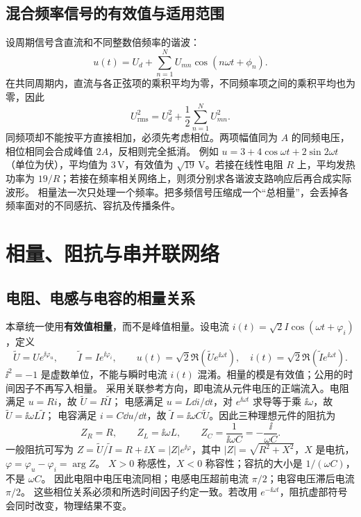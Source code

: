 \subsection{混合频率信号的有效值与适用范围}
设周期信号含直流和不同整数倍频率的谐波：
\[
 u(t)=U_d+\sum_{n=1}^{N}U_{mn}\cos(n\omega t+\phi_n).
\]
在共同周期内，直流与各正弦项的乘积平均为零，不同频率项之间的乘积平均也为零，因此
\[
 U_{\mathrm{rms}}^2=U_d^2+\frac12\sum_{n=1}^{N}U_{mn}^2.
\]
同频项却不能按平方直接相加，必须先考虑相位。两项幅值同为 $A$ 的同频电压，相位相同会合成峰值 $2A$，反相则完全抵消。
例如 $u=3+4\cos\omega t+2\sin2\omega t$（单位为伏），平均值为 $3\,\mathrm V$，有效值为 $\sqrt{19}\,\mathrm V$。若接在线性电阻 $R$ 上，平均发热功率为 $19/R$；若接在频率相关网络上，则须分别求各谐波支路响应后再合成实际波形。
相量法一次只处理一个频率。把多频信号压缩成一个“总相量”，会丢掉各频率面对的不同感抗、容抗及传播条件。



\section{相量、阻抗与串并联网络}

\subsection{电阻、电感与电容的相量关系}


本章统一使用\textbf{有效值相量}，而不是峰值相量。设电流
$i(t)=\sqrt2 I\cos(\omega t+\varphi_i)$，定义
\begin{equation}
 \widetilde U=Ue^{\ii\varphi_u},\qquad
 \widetilde I=Ie^{\ii\varphi_i},\qquad
 u(t)=\sqrt2\Re(\widetilde Ue^{\ii\omega t}),\quad
 i(t)=\sqrt2\Re(\widetilde Ie^{\ii\omega t}).
\end{equation}
$\ii^2=-1$ 是虚数单位，不能与瞬时电流 $i(t)$ 混淆。相量的模是有效值；公用的时间因子不再写入相量。
采用关联参考方向，即电流从元件电压的正端流入。电阻满足 $u=Ri$，故 $\widetilde U=R\widetilde I$；
电感满足 $u=L\dd i/\dd t$，对 $e^{\ii\omega t}$ 求导等于乘 $\ii\omega$，故 $\widetilde U=\ii\omega L\widetilde I$；
电容满足 $i=C\dd u/\dd t$，故 $\widetilde I=\ii\omega C\widetilde U$。因此三种理想元件的阻抗为
\begin{equation}
 Z_R=R,\qquad Z_L=\ii\omega L,\qquad Z_C=\frac1{\ii\omega C}=-\frac{\ii}{\omega C}.
\end{equation}
一般阻抗可写为 $Z=\widetilde U/\widetilde I=R+\ii X=|Z|e^{\ii\varphi}$，其中
$|Z|=\sqrt{R^2+X^2}$，$X$ 是电抗，$\varphi=\varphi_u-\varphi_i=\arg Z$。
$X>0$ 称感性，$X<0$ 称容性；容抗的大小是 $1/(\omega C)$，不是 $\omega C$。
因此电阻中电压电流同相；电感电压超前电流 $\pi/2$；电容电压滞后电流 $\pi/2$。
这些相位关系必须和所选时间因子约定一致。若改用 $e^{-\ii\omega t}$，阻抗虚部符号会同时改变，物理结果不变。

